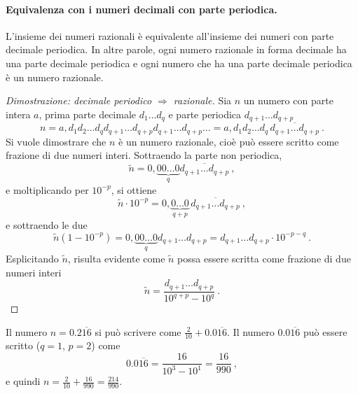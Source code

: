 \paragraph{Equivalenza con i numeri decimali con parte periodica.} L'insieme dei numeri razionali è equivalente all'insieme dei numeri con parte decimale periodica. In altre parole, ogni numero razionale in forma decimale ha una parte decimale periodica e ogni numero che ha una parte decimale periodica è un numero razionale.

\begin{proof}[Dimostrazione: decimale periodico $\Rightarrow$ razionale]
Sia $n$ un numero con parte intera $a$, prima parte decimale $d_1 \dots d_{q}$ e parte periodica $d_{q+1}\dots d_{q+p}$
\begin{equation}
   n = a,d_1 d_2 \dots d_q d_{q+1} \dots d_{q+p} d_{q+1} \dots d_{q+p} \dots = 
       a,d_1 d_2 \dots d_q \, \overline{ d_{q+1} \dots d_{q+p} } \ . 
\end{equation}
Si vuole dimostrare che $n$ è un numero razionale, cioè può essere scritto come frazione di due numeri interi. Sottraendo la parte non periodica,
\begin{equation}
    \tilde{n} = 0, \underbrace{00 \dots 0}_{q} \overline{d_{q+1} \dots d_{q+p}} \ ,
\end{equation}
e moltiplicando per $10^{-p}$, si ottiene
\begin{equation}
    \tilde{n} \cdot 10^{-p} = 0, \underbrace{0 \dots 0}_{q+p} \, \overline{d_{q+1} \dots d_{q+p}} \ ,
\end{equation}
e sottraendo le due
\begin{equation}
    \tilde{n} ( 1 - 10^{-p} ) = 0, \underbrace{00 \dots 0}_{q} d_{q+1} \dots d_{q+p} = d_{q+1}\dots d_{q+p} \cdot 10^{-p-q} \ .
\end{equation}
Esplicitando $\tilde{n}$, risulta evidente come $\tilde{n}$ possa essere scritta come frazione di due numeri interi
\begin{equation}
    \tilde{n} = \dfrac{ d_{q+1}\dots d_{q+p} }{ 10^{q+p} - 10^{q} } \ .
\end{equation}
\end{proof}

\begin{example}
    Il numero $n = 0.2\overline{16}$ si può scrivere come $\frac{2}{10} + 0.0\overline{16}$. Il numero $0.0\overline{16}$ può essere scritto ($q=1$, $p=2$) come
    \begin{equation}
        0.0\overline{16} = \dfrac{16}{10^3-10^{1}} = \dfrac{16}{990} \ ,
    \end{equation}
e quindi $n = \frac{2}{10} + \frac{16}{990} = \frac{214}{990}$.
\end{example}

